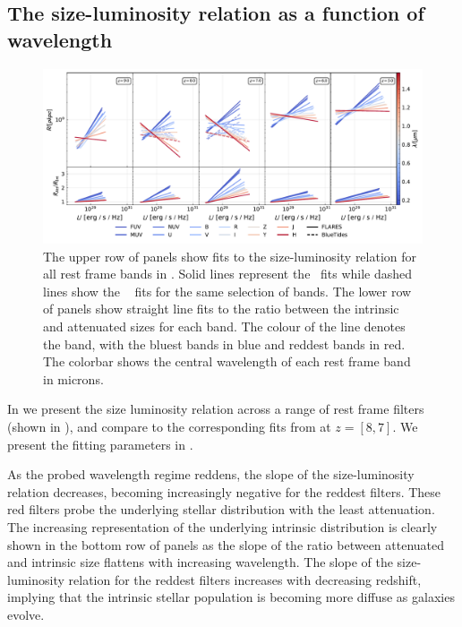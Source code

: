 \subsection{The size-luminosity relation as a function of wavelength}

\begin{figure}
    \centering
	\includegraphics[width=\linewidth]{Figures/FilterCompHalfLightRadius_pix_Complete_sim_Total_default.pdf}
    \caption{The upper row of panels show fits to the size-luminosity relation for all rest frame bands in . Solid lines represent the \flares\ fits while dashed lines show the \bluetides\ \citep{Marshall21} fits for the same selection of bands. The lower row of panels show straight line fits to the ratio between the intrinsic and attenuated sizes for each band. The colour of the line denotes the band, with the bluest bands in blue and reddest bands in red. The colorbar shows the central wavelength of each rest frame band in microns.}
    \label{fig:colors}
\end{figure}

In  we present the size luminosity relation across a range of rest frame filters (shown in ), and compare to the corresponding fits from \cite{Marshall21} at $z=[8, 7]$. We present the fitting parameters in .

As the probed wavelength regime reddens, the slope of the size-luminosity relation decreases, becoming increasingly negative for the reddest filters. These red filters probe the underlying stellar distribution with the least attenuation. The increasing representation of the underlying intrinsic distribution is clearly shown in the bottom row of panels as the slope of the ratio between attenuated and intrinsic size flattens with increasing wavelength. The slope of the size-luminosity relation for the reddest filters increases with decreasing redshift, implying that the intrinsic stellar population is becoming more diffuse as galaxies evolve. %

